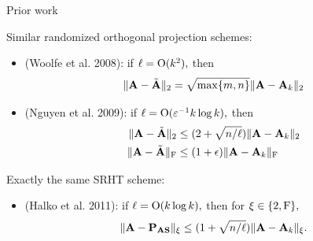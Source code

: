\documentclass[xcolor=x11names,compress,ignorenonframetext]{beamer}
\renewcommand{\(}{\begin{columns}}
\renewcommand{\)}{\end{columns}}
\newcommand{\<}[1]{\begin{column}{#1}}
\renewcommand{\>}{\end{column}}
\def\refcolor{DodgerBlue4}
\newcommand{\refer}[1]{({\color{\refcolor}#1})}
\begin{document}
 \begin{frame}{Prior work}

 Similar randomized orthogonal projection schemes:
 \begin{itemize}
  \item \refer{Woolfe et al. 2008}: if $\ell = \mathrm{O}(k^2),$ then 
   \[
     \|\mathbf{A} - \tilde{\mathbf{A}}\|_2 = \sqrt{\max\{m,n\}} \|\mathbf{A} - \mathbf{A}_k\|_2
   \]
  \item \refer{Nguyen et al. 2009}: if $\ell = \mathrm{O}(\varepsilon^{-1} k \log k),$ then
  \begin{align*}
   \|\mathbf{A} - \tilde{\mathbf{A}}\|_2 & \leq (2 + \sqrt{n/\ell}) \|\mathbf{A} - \mathbf{A}_k\|_2 \\
   \|\mathbf{A} - \tilde{\mathbf{A}}\|_{\mathrm{F}} & \leq (1 + \epsilon) \|\mathbf{A} - \mathbf{A}_k\|_{\mathrm{F}}
  \end{align*}
 \end{itemize}

 Exactly the same SRHT scheme:
 \begin{itemize}
  \item \refer{Halko et al. 2011}: if $\ell = \mathrm{O}(k \log k),$ then for $\xi \in \{2, \mathrm{F}\},$
  \[ \|\mathbf{A} - \mathbf{P}_{\mathbf{A} \mathbf{S}}\|_\xi \leq (1 + \sqrt{n/\ell})\|\mathbf{A} - \mathbf{A}_k\|_\xi.
  \]
 \end{itemize}

\end{frame}
% 
%  
%  
\end{document}
